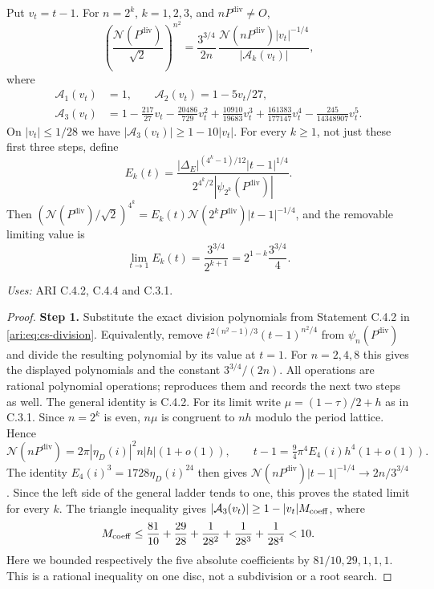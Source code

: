 \begin{proposition}\label{ari:C.8.4}
Put $v_t=t-1$. For $n=2^k$, $k=1,2,3$, and $nP^{\mathrm{div}}\ne O$,
\begin{equation}\label{ari:eq:ca-ladder}
 \left(\frac{\mathcal N(P^{\mathrm{div}})}{\sqrt2}\right)^{n^2}
 =\frac{3^{3/4}}{2n}\,
       \frac{\mathcal N(nP^{\mathrm{div}})|v_t|^{-1/4}}{|\mathcal A_k(v_t)|},
\end{equation}
where
\begin{align*}
 \mathcal A_1(v_t)&=1,\qquad \mathcal A_2(v_t)=1-5v_t/27,\\
 \mathcal A_3(v_t)&=1-\frac{217}{27}v_t-\frac{20486}{729}v_t^2
       +\frac{10910}{19683}v_t^3
       +\frac{161383}{177147}v_t^4
       -\frac{245}{14348907}v_t^5.
\end{align*}
On $|v_t|\le1/28$ we have $|\mathcal A_3(v_t)|\ge1-10|v_t|$.
For every $k\ge1$, not just these first three steps, define
\[
 E_k(t)=\frac{|\Delta_E|^{(4^k-1)/12}|t-1|^{1/4}}
 {2^{4^k/2}|\psi_{2^k}(P^{\mathrm{div}})|}.
\]
Then $(\mathcal N(P^{\mathrm{div}})/\sqrt2)^{4^k}=E_k(t)\mathcal N(2^kP^{\mathrm{div}})|t-1|^{-1/4}$,
and the removable limiting value is
\[
 \lim_{t\to1}E_k(t)=\frac{3^{3/4}}{2^{k+1}}
                 =2^{1-k}\frac{3^{3/4}}4.
\]
\end{proposition}
\noindent\textit{Uses:} ARI C.4.2, C.4.4 and C.3.1.\par
\begin{proof}
\noindent\textbf{Step 1.} Substitute the exact division polynomials from Statement C.4.2
in \eqref{ari:eq:cs-division}. Equivalently, remove
$t^{2(n^2-1)/3}(t-1)^{n^2/4}$ from $\psi_n(P^{\mathrm{div}})$ and divide
the resulting polynomial by its value at $t=1$. For $n=2,4,8$
this gives the displayed polynomials and the constant
$3^{3/4}/(2n)$. All operations are rational polynomial operations;
 reproduces them and records
the next two steps as well. The general identity is C.4.2.
For its limit write $\mu=(1-\tau)/2+h$ as in C.3.1. Since
$n=2^k$ is even, $n\mu$ is congruent to $nh$ modulo the
period lattice. Hence
\[
 \mathcal N(nP^{\mathrm{div}})=2\pi|\eta_D(i)|^2 n|h|(1+o(1)),\qquad
 t-1=\tfrac94\pi^4E_4(i)h^4(1+o(1)).
\]
The identity $E_4(i)^3=1728\eta_D(i)^{24}$ then gives
$\mathcal N(nP^{\mathrm{div}})|t-1|^{-1/4}\to2n/3^{3/4}$.
Since the left side of the general ladder tends to one,
this proves the stated limit for every $k$.
The triangle inequality gives
$|\mathcal A_3(v_t)|\ge1-|v_t|M_{\rm coeff}$, where
\[
 M_{\rm coeff}\le\frac{81}{10}+\frac{29}{28}
                +\frac1{28^2}+\frac1{28^3}+\frac1{28^4}<10.
\]
Here we bounded respectively the five absolute coefficients by
$81/10,29,1,1,1$. This is a rational inequality on one disc,
not a subdivision or a root search.
\end{proof}

